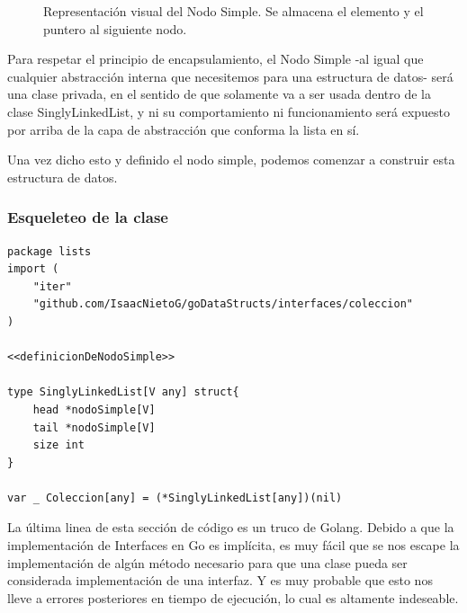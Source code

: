 \documentclass[11pt]{article}
\begin{document}
\begin{figure}[h]
\centering
{}
\caption{Representación visual del Nodo Simple. Se almacena el elemento y el puntero al siguiente nodo.}
\end{figure}

Para respetar el principio de encapsulamiento, el Nodo Simple -al igual que cualquier abstracción interna que necesitemos para una estructura de datos- será una clase privada, en el sentido de que solamente va a ser usada dentro de la clase SinglyLinkedList, y ni su comportamiento ni funcionamiento será expuesto por arriba de la capa de abstracción que conforma la lista en sí.

Una vez dicho esto y definido el nodo simple, podemos comenzar a construir esta estructura de datos.
\subsubsection{Esqueleteo de la clase}
\label{sec:orgc93fea2}

\begin{verbatim}
package lists
import (
	"iter"
	"github.com/IsaacNietoG/goDataStructs/interfaces/coleccion"
)

<<definicionDeNodoSimple>>

type SinglyLinkedList[V any] struct{
	head *nodoSimple[V]
	tail *nodoSimple[V]
	size int
}

var _ Coleccion[any] = (*SinglyLinkedList[any])(nil)

\end{verbatim}

La última linea de esta sección de código es un truco de Golang. Debido a que la implementación de Interfaces en Go es implícita, es muy fácil que se nos escape la implementación de algún método necesario para que una clase pueda ser considerada implementación de una interfaz. Y es muy probable que esto nos lleve a errores posteriores en tiempo de ejecución, lo cual es altamente indeseable.
\end{document}
